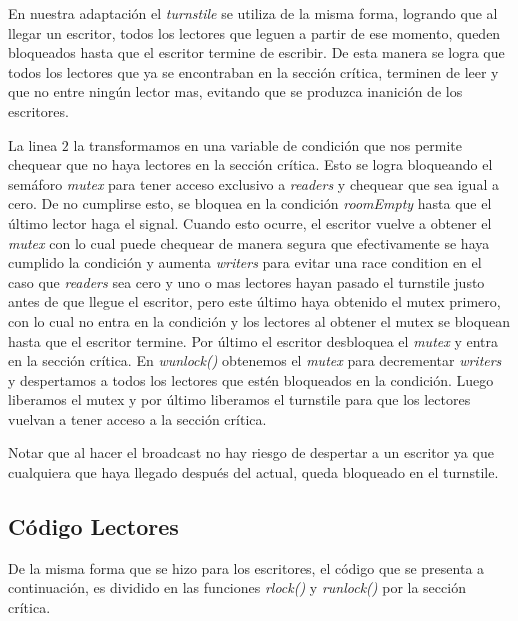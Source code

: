 \documentclass[a4paper,11pt]{article}
\begin{document}

En nuestra adaptación el \emph{turnstile} se utiliza de la misma forma, logrando que al llegar un escritor, todos los lectores que leguen a partir de ese momento, queden bloqueados hasta que el escritor termine de escribir. De esta manera se logra que todos los lectores que ya se encontraban en la sección crítica, terminen de leer y que no entre ningún lector mas, evitando que se produzca inanición de los escritores.

La linea $2$ la transformamos en una variable de condición que nos permite chequear que no haya lectores en la sección crítica. Esto se logra bloqueando el semáforo \emph{mutex} para tener acceso exclusivo a \emph{readers} y chequear que sea igual a cero. De no cumplirse esto, se bloquea en la condición \emph{roomEmpty} hasta que el último lector haga el signal. Cuando esto ocurre, el escritor vuelve a obtener el \emph{mutex} con lo cual puede chequear de manera segura que efectivamente se haya cumplido la condición y aumenta \emph{writers} para evitar una race condition en el caso que \emph{readers} sea cero y uno o mas lectores hayan pasado el turnstile justo antes de que llegue el escritor, pero este último haya obtenido el mutex primero, con lo cual no entra en la condición y los lectores al obtener el mutex se bloquean hasta que el escritor termine. Por último el escritor desbloquea el \emph{mutex} y entra en la sección crítica.
En \emph{wunlock()} obtenemos el \emph{mutex} para decrementar \emph{writers} y despertamos a todos los lectores que estén bloqueados en la condición. Luego liberamos el mutex y por último liberamos el turnstile para que los lectores vuelvan a tener acceso a la sección crítica.

Notar que al hacer el broadcast no hay riesgo de despertar a un escritor ya que cualquiera que haya llegado después del actual, queda bloqueado en el turnstile. 


\subsection{Código Lectores}
De la misma forma que se hizo para los escritores, el código que se presenta a continuación, es dividido en las funciones \emph{rlock()} y \emph{runlock()} por la sección crítica.
\end{document}
